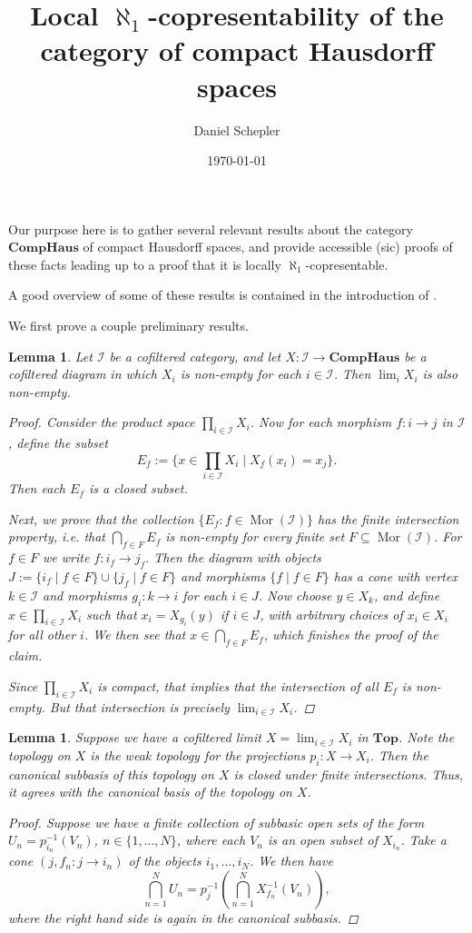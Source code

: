 \documentclass[a4paper,12pt,reqno]{amsart}
\title{Local $\aleph_1$-copresentability of the category of compact Hausdorff spaces}
\author{Daniel Schepler}
\date{\today}
\newtheorem{lemma}[proposition]{Lemma}
\newcommand{\Mor}{\operatorname{Mor}}
\newcommand{\CompHaus}{\mathbf{CompHaus}}
\newcommand{\I}{\mathcal{I}}
\begin{document}
\maketitle

Our purpose here is to gather several relevant results about the category $\CompHaus$ of compact Hausdorff spaces, and provide accessible (sic) proofs of these facts leading up to a proof that it is locally $\aleph_1$-copresentable.

A good overview of some of these results is contained in the introduction of \cite{Hoff18}.

We first prove a couple preliminary results.

\begin{lemma}
	Let $\I$ be a cofiltered category, and let $X : \I \to \CompHaus$ be a cofiltered diagram in which $X_i$ is non-empty for each $i\in \I$. Then $\lim_i X_i$ is also non-empty.
	
	\begin{proof}
		Consider the product space $\prod_{i\in \I} X_i$. Now for each morphism $f : i \to j$ in $\I$, define the subset
		$$\textstyle E_f := \bigl\{ x \in \prod_{i \in \I} X_i \mid X_f(x_i) = x_j \bigr\}.$$
		Then each $E_f$ is a closed subset.
		
		Next, we prove that the collection $\{ E_f : f \in \Mor(\I) \}$ has the finite intersection property, i.e. that $\bigcap_{f\in F} E_f$ is non-empty for every finite set $F \subseteq \Mor(\I)$. For $f\in F$ we write $f : i_f \to j_f$. Then the diagram with objects $J := \{ i_f \mid f \in F \} \cup \{ j_f \mid f \in F \}$ and morphisms $\{ f \mid f \in F \}$ has a cone with vertex $k \in \I$ and morphisms $g_i : k \to i$ for each $i \in J$. Now choose $y \in X_k$, and define $x \in \prod_{i \in \I} X_i$ such that $x_i = X_{g_i}(y)$ if $i \in J$, with arbitrary choices of $x_i \in X_i$ for all other $i$. We then see that $x \in \bigcap_{f\in F} E_f$, which finishes the proof of the claim.
		
		Since $\prod_{i \in \I} X_i$ is compact, that implies that the intersection of all $E_f$ is non-empty. But that intersection is precisely $\lim_{i \in \I} X_i$.
	\end{proof}
\end{lemma}

\begin{lemma}
	Suppose we have a cofiltered limit $X = \lim_{i\in \I} X_i$ in $\mathbf{Top}$. Note the topology on $X$ is the weak topology for the projections $p_i : X \to X_i$. Then the canonical subbasis of this topology on $X$ is closed under finite intersections. Thus, it agrees with the canonical basis of the topology on $X$.
	
	\begin{proof}
		Suppose we have a finite collection of subbasic open sets of the form $U_n = p_{i_n}^{-1}(V_n)$, $n \in \{ 1, \ldots, N \}$, where each $V_n$ is an open subset of $X_{i_n}$. Take a cone $(j, f_n : j \to i_n)$ of the objects $i_1, \ldots, i_N$. We then have
		$$\bigcap_{n=1}^N U_n = p_j^{-1} \left( \bigcap_{n=1}^N X_{f_n}^{-1}(V_n) \right),$$
		where the right hand side is again in the canonical subbasis.
	\end{proof}
\end{lemma}
\end{document}
